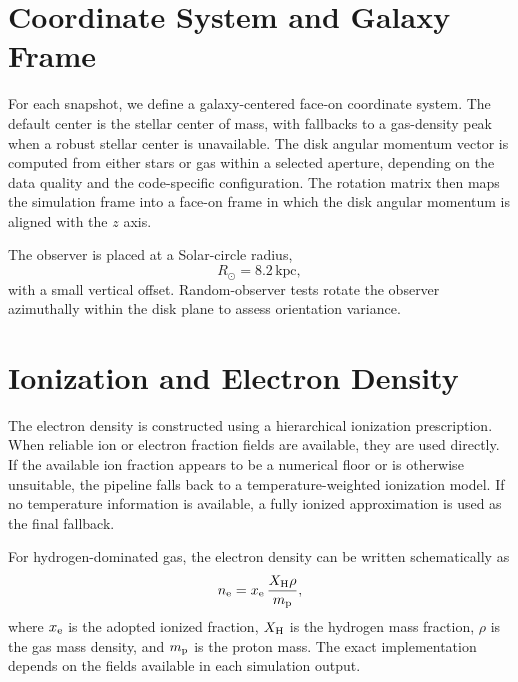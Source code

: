 \documentclass[twocolumn]{aastex631}
\newcommand{\ne}{n_{\rm e}}
\newcommand{\kpc}{\mathrm{kpc}}
\begin{document}
\section{Coordinate System and Galaxy Frame}\label{sec:frame}
For each snapshot, we define a galaxy-centered face-on coordinate system.  The default center is the stellar center of mass, with fallbacks to a gas-density peak when a robust stellar center is unavailable.  The disk angular momentum vector is computed from either stars or gas within a selected aperture, depending on the data quality and the code-specific configuration.  The rotation matrix then maps the simulation frame into a face-on frame in which the disk angular momentum is aligned with the $z$ axis.

The observer is placed at a Solar-circle radius,
\begin{equation}
    R_{\odot} = 8.2\,\kpc,
\end{equation}
with a small vertical offset.  Random-observer tests rotate the observer azimuthally within the disk plane to assess orientation variance.

\section{Ionization and Electron Density}\label{sec:ionization}
The electron density is constructed using a hierarchical ionization prescription.  When reliable ion or electron fraction fields are available, they are used directly.  If the available ion fraction appears to be a numerical floor or is otherwise unsuitable, the pipeline falls back to a temperature-weighted ionization model.  If no temperature information is available, a fully ionized approximation is used as the final fallback.

For hydrogen-dominated gas, the electron density can be written schematically as
\begin{equation}
    \ne = x_{\rm e}\,\frac{X_{\rm H}\rho}{m_{\rm p}},
\end{equation}
where $x_{\rm e}$ is the adopted ionized fraction, $X_{\rm H}$ is the hydrogen mass fraction, $\rho$ is the gas mass density, and $m_{\rm p}$ is the proton mass.  The exact implementation depends on the fields available in each simulation output.
\end{document}
